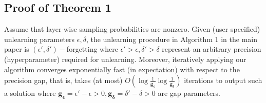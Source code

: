 \subsection{Proof of Theorem 1}
\begin{theorem}
Assume that layer-wise sampling probabilities are nonzero. Given (user specified) unlearning parameters $\epsilon,\delta$, the unlearning procedure in Algorithm 1 in the main paper is $(\epsilon',\delta')-$forgetting where $\epsilon'>\epsilon,\delta'>\delta$ represent an arbitrary  precision (hyperparameter) required for unlearning. Moreover, iteratively applying our algorithm converges exponentially fast (in expectation) with respect to the precision gap, that is, takes (at most) $O(\log\frac{1}{\mathbf{g_{\epsilon}}}\log\frac{1}{\mathbf{g_{\delta}}})$ iterations to output such a solution where  $\mathbf{g_{\epsilon}} = \epsilon'-\epsilon>0,\mathbf{g_{\delta}}=\delta'-\delta>0$ are gap parameters.
\end{theorem}
